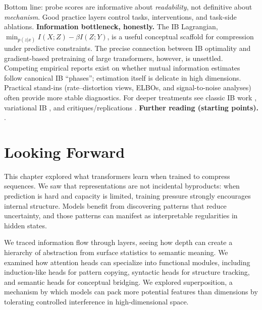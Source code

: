 \noindent Bottom line: probe scores are informative about \emph{readability}, not definitive about \emph{mechanism}. Good practice layers control tasks, interventions, and task-side ablations.
\textbf{Information bottleneck, honestly.}
The IB Lagrangian, $\min_{p(z|x)} I(X;Z) - \beta I(Z;Y)$, is a useful conceptual scaffold for compression under predictive constraints. The precise connection between IB optimality and gradient-based pretraining of large transformers, however, is unsettled. Competing empirical reports exist on whether mutual information estimates follow canonical IB ``phases''; estimation itself is delicate in high dimensions. Practical stand-ins (rate--distortion views, ELBOs, and signal-to-noise analyses) often provide more stable diagnostics. For deeper treatments see classic IB work \citep{tishby1999ib}, variational IB \citep{alemi2016vib}, and critiques/replications \citep{saxe2019ib}.
\textbf{Further reading (starting points).}
\citep{tenney2019pipeline,jawahar2019structure,rogers2020bertology,hewitt2019structural,elhage2021circuits,olsson2022icl,geva2021kv,ravichander2020probes,belinkov2019survey,tishby1999ib,alemi2016vib,saxe2019ib}.




\section{Looking Forward}
\label{sec:looking_forward}

\vspace{1em}

This chapter explored what transformers learn when trained to compress sequences. We saw that representations are not incidental byproducts: when prediction is hard and capacity is limited, training pressure strongly encourages internal structure. Models benefit from discovering patterns that reduce uncertainty, and those patterns can manifest as interpretable regularities in hidden states.

We traced information flow through layers, seeing how depth can create a hierarchy of abstraction from surface statistics to semantic meaning. We examined how attention heads can specialize into functional modules, including induction-like heads for pattern copying, syntactic heads for structure tracking, and semantic heads for conceptual bridging. We explored superposition, a mechanism by which models can pack more potential features than dimensions by tolerating controlled interference in high-dimensional space.

